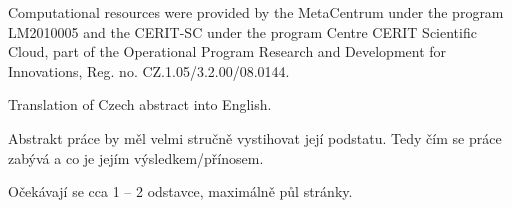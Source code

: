 \documentclass[11pt,twoside,a4paper]{book}
\begin{document}

\coverpagestarts


\acknowledgements
\noindent
Computational resources were provided by the MetaCentrum under the program LM2010005 and the CERIT-SC under the program Centre CERIT Scientific Cloud, part of the Operational Program Research and Development for Innovations, Reg. no. CZ.1.05/3.2.00/08.0144.






 
\abstractpage

Translation of Czech abstract into English.


\baselineskip

\noindent
Abstrakt práce by měl velmi stručně vystihovat její podstatu. Tedy čím se práce zabývá a co je jejím výsledkem/přínosem.

\noindent
Očekávají se cca 1 -- 2 odstavce, maximálně půl stránky.


\tableofcontents



\listoffigures



\listoftables
\end{document}
